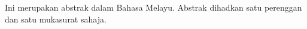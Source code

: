 
Ini merupakan abstrak dalam Bahasa Melayu. Abstrak dihadkan satu perenggan dan satu mukasurat sahaja.
